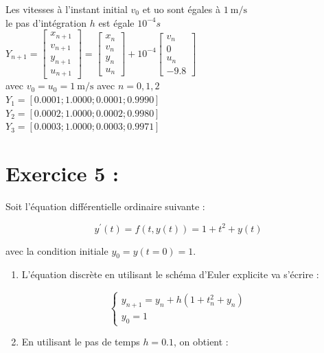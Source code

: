 \documentclass[10pt]{article}
\begin{document}
Les vitesses à l'instant initial \(v_{0}\) et uo sont égales à \(1 \mathrm{~m} / \mathrm{s}\)\\
le pas d'intégration \(h\) est égale \(10^{-4} s\)\\
\(Y_{n+1}=\left[\begin{array}{l}x_{n+1} \\ v_{n+1} \\ y_{n+1} \\ u_{n+1}\end{array}\right]=\left[\begin{array}{l}x_{n} \\ v_{n} \\ y_{n} \\ u_{n}\end{array}\right]+10^{-4}\left[\begin{array}{c}v_{n} \\ 0 \\ u_{n} \\ -9.8\end{array}\right]\)\\
avec \(v_{0}=u_{0}=1 \mathrm{~m} / \mathrm{s}\) avec \(n=0,1,2\)\\
\(Y_{1}=[0.0001 ; 1.0000 ; 0.0001 ; 0.9990]\)\\
\(Y_{2}=[0.0002 ; 1.0000 ; 0.0002 ; 0.9980]\)\\
\(Y_{3}=[0.0003 ; 1.0000 ; 0.0003 ; 0.9971]\)

\section*{Exercice 5 :}
Soit l'équation différentielle ordinaire suivante :

\[
y^{\prime}(t)=f(t, y(t))=1+t^{2}+y(t)
\]

avec la condition initiale \(y_{0}=y(t=0)=1\).

\begin{enumerate}
  \item L'équation discrète en utilisant le schéma d'Euler explicite va s'écrire :
\end{enumerate}

\[
\left\{\begin{array}{l}
y_{n+1}=y_{n}+h\left(1+t_{n}^{2}+y_{n}\right) \\
y_{0}=1
\end{array}\right.
\]

\begin{enumerate}
  \setcounter{enumi}{1}
  \item En utilisant le pas de temps \(h=0.1\), on obtient :
\end{enumerate}
\end{document}
